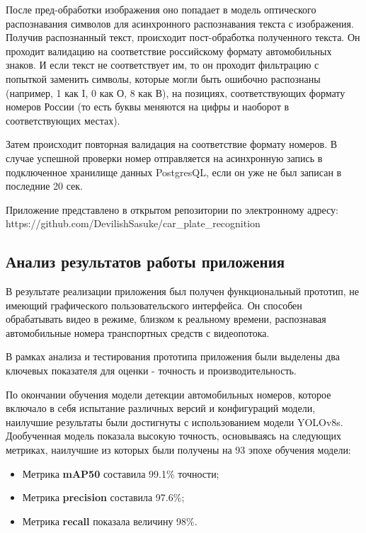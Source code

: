 \documentclass[a4paper,12pt]{article}
\begin{document}
После пред-обработки изображения оно попадает в модель оптического распознавания символов для асинхронного распознавания текста с изображения. Получив распознанный текст, происходит пост-обработка полученного текста. Он проходит валидацию на соответствие российскому формату автомобильных знаков. И если текст не соответствует им, то он проходит фильтрацию с попыткой заменить символы, которые могли быть ошибочно распознаны (например, 1 как I, 0 как О, 8 как В), на позициях, соответствующих формату номеров России (то есть буквы меняются на цифры и наоборот в соответствующих местах).

Затем происходит повторная валидация на соответствие формату номеров. В случае успешной проверки номер отправляется на асинхронную запись в подключенное хранилище данных PostgresQL, если он уже не был записан в последние 20 сек.

Приложение представлено в открытом репозитории по электронному адресу: \\ https://github.com/DevilishSasuke/car\_plate\_recognition

\subsection{Анализ результатов работы приложения}

В результате реализации приложения был получен функциональный прототип, не имеющий графического пользовательского интерфейса. Он способен обрабатывать видео в режиме, близком к реальному времени, распознавая автомобильные номера транспортных средств с видеопотока.

В рамках анализа и тестирования прототипа приложения были выделены два ключевых показателя для оценки - точность и производительность.

По окончании обучения модели детекции автомобильных номеров, которое включало в себя испытание различных версий и конфигураций модели, наилучшие результаты были достигнуты с использованием модели YOLOv8s. 
Дообученная модель показала высокую точность, основываясь на следующих метриках, наилучшие из которых были получены на 93 эпохе обучения модели:
\begin{itemize}
    \item Метрика \textbf{mAP50} составила 99.1\% точности;
    \item Метрика \textbf{precision} составила 97.6\%;
    \item Метрика \textbf{recall} показала величину 98\%.
\end{itemize}
\end{document}
